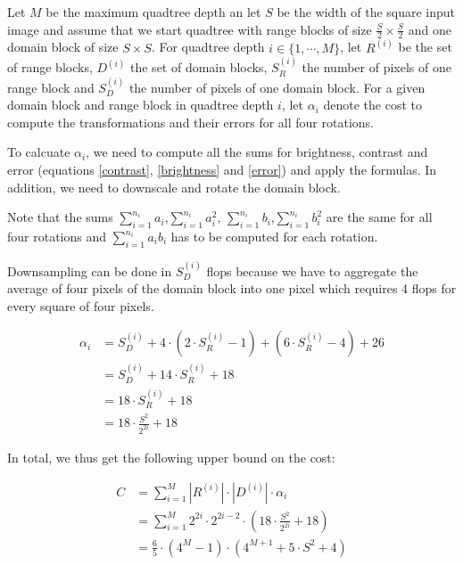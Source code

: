 Let $M$ be the maximum quadtree depth an let $S$ be the width of the square
input image and assume that we start quadtree with range blocks of size
$\frac{S}{2}\times\frac{S}{2}$ and one domain block of size $S\times S$. For
quadtree depth $i \in \{1,\cdots, M\}$, let $R^{(i)}$ be the set of range
blocks, $D^{(i)}$ the set of domain blocks, $S_{R}^{(i)}$ the number of pixels
of one range block and $S_{D}^{(i)}$ the number of pixels of one domain block.
For a given domain block and range block in quadtree depth $i$, let $\alpha_{i}$
denote the cost to compute the transformations and their errors for all four
rotations.

To calcuate $\alpha_{i}$, we need to compute all the sums for brightness,
contrast and error (equations \eqref{contrast}, \eqref{brightness} and
\eqref{error}) and apply the formulas. In addition, we need to downscale and
rotate the domain block.

Note that the sums $\sum_{i=1}^{n_i} a_i$,$\sum_{i=1}^{n_i} a_i^2$,
$\sum_{i=1}^{n_i} b_i$,$\sum_{i=1}^{n_i} b_i^2$ are the same for all four
rotations and $\sum_{i=1}^{n_i} a_i b_i$ has to be computed for each rotation.

Downsampling can be done in $S_{D}^{(i)}$ flops because we have to aggregate the
average of four pixels of the domain block into one pixel which requires 4 flops
for every square of four pixels.

\begin{align}
  \alpha_i &= S_{D}^{(i)} + 4 \cdot (2\cdot S_{R}^{(i)}-1) + (6\cdot S_{R}^{(i)}-4) +  26\\
           &= S_{D}^{(i)} + 14\cdot S_{R}^{(i)} + 18 \\
           &= 18\cdot S_{R}^{(i)} + 18 \\
           &= 18 \cdot \frac{S^2}{2^{2i}} + 18
\end{align}

In total, we thus get the following upper bound on the cost:

\begin{align}
C &= \sum_{i=1}^M |R^{(i)}| \cdot |D^{(i)}| \cdot \alpha_i \\
  &= \sum_{i=1}^M 2^{2i} \cdot 2^{2i-2} \cdot (18 \cdot \frac{S^2}{2^{2i}} + 18) \\
  &= \frac{6}{5}\cdot (4^{M}-1)\cdot (4^{M+1} + 5\cdot S^{2} + 4)
\end{align}

